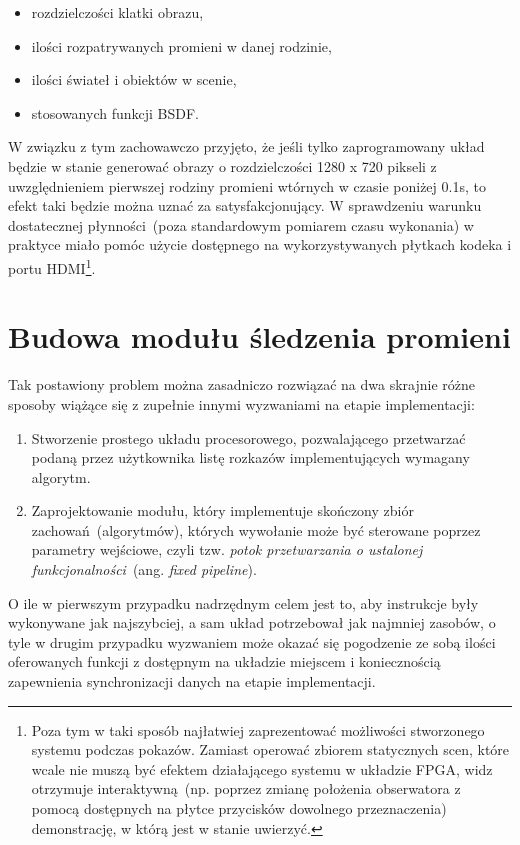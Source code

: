 \begin{enumerate}
\begin{itemize}
\item rozdzielczości klatki obrazu,
\item ilości rozpatrywanych promieni w danej rodzinie,
\item ilości świateł i obiektów w scenie,
\item stosowanych funkcji BSDF.
\end{itemize} 
W związku z tym zachowawczo przyjęto, że jeśli tylko zaprogramowany układ będzie w stanie generować obrazy o rozdzielczości 1280 x 720 pikseli z uwzględnieniem pierwszej rodziny promieni wtórnych w czasie poniżej 0.1s, to efekt taki będzie można uznać za satysfakcjonujący. W sprawdzeniu warunku dostatecznej płynności~(poza standardowym pomiarem czasu wykonania) w praktyce miało pomóc użycie dostępnego na wykorzystywanych płytkach kodeka i portu HDMI\footnote{Poza tym w taki sposób najłatwiej zaprezentować możliwości stworzonego systemu podczas pokazów. Zamiast operować zbiorem statycznych scen, które wcale nie muszą być efektem działającego systemu w układzie FPGA, widz otrzymuje interaktywną~(np. poprzez zmianę położenia obserwatora z pomocą dostępnych na płytce przycisków dowolnego przeznaczenia) demonstrację, w którą jest w stanie uwierzyć.}.
\end{enumerate}

\section{Budowa modułu śledzenia promieni}
Tak postawiony problem można zasadniczo rozwiązać na dwa skrajnie różne sposoby wiążące się z zupełnie innymi wyzwaniami na etapie implementacji:
\begin{enumerate}
\item Stworzenie prostego układu procesorowego, pozwalającego przetwarzać podaną przez użytkownika listę rozkazów implementujących wymagany algorytm.
\item Zaprojektowanie modułu, który implementuje skończony zbiór zachowań~(algorytmów), których wywołanie może być sterowane poprzez parametry wejściowe, czyli tzw. \textit{potok przetwarzania o ustalonej funkcjonalności}~(ang. \textit{fixed pipeline}).
\end{enumerate}
O ile w pierwszym przypadku nadrzędnym celem jest to, aby instrukcje były wykonywane jak najszybciej, a sam układ potrzebował jak najmniej zasobów, o tyle w drugim przypadku wyzwaniem może okazać się pogodzenie ze sobą ilości oferowanych funkcji z dostępnym na układzie miejscem i koniecznością zapewnienia synchronizacji danych na etapie implementacji.

